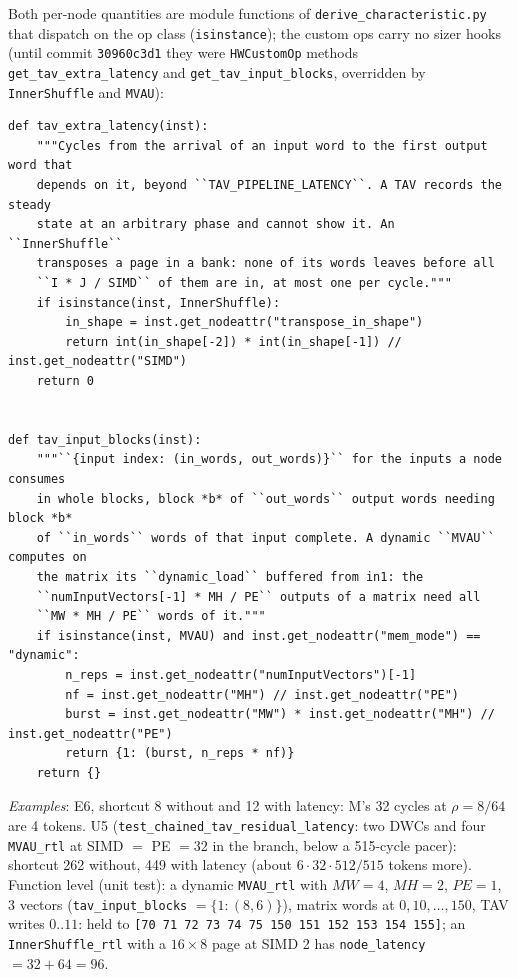 \documentclass[10pt,a4paper]{article}
\newcommand{\code}[1]{\texttt{#1}}
\newcommand{\file}{\code{derive\_characteristic.py}}
\begin{document}
Both per-node quantities are module functions of \file{} that dispatch on the op
class (\code{isinstance}); the custom ops carry no sizer hooks (until commit
\code{30960c3d1} they were \code{HWCustomOp} methods \code{get\_tav\_extra\_latency} and
\code{get\_tav\_input\_blocks}, overridden by \code{InnerShuffle} and \code{MVAU}):

\begin{lstlisting}[firstnumber=405,title={\texttt{src/finn/transformation/fpgadataflow/derive\_characteristic.py}, lines 405--429}]
def tav_extra_latency(inst):
    """Cycles from the arrival of an input word to the first output word that
    depends on it, beyond ``TAV_PIPELINE_LATENCY``. A TAV records the steady
    state at an arbitrary phase and cannot show it. An ``InnerShuffle``
    transposes a page in a bank: none of its words leaves before all
    ``I * J / SIMD`` of them are in, at most one per cycle."""
    if isinstance(inst, InnerShuffle):
        in_shape = inst.get_nodeattr("transpose_in_shape")
        return int(in_shape[-2]) * int(in_shape[-1]) // inst.get_nodeattr("SIMD")
    return 0


def tav_input_blocks(inst):
    """``{input index: (in_words, out_words)}`` for the inputs a node consumes
    in whole blocks, block *b* of ``out_words`` output words needing block *b*
    of ``in_words`` words of that input complete. A dynamic ``MVAU`` computes on
    the matrix its ``dynamic_load`` buffered from in1: the
    ``numInputVectors[-1] * MH / PE`` outputs of a matrix need all
    ``MW * MH / PE`` words of it."""
    if isinstance(inst, MVAU) and inst.get_nodeattr("mem_mode") == "dynamic":
        n_reps = inst.get_nodeattr("numInputVectors")[-1]
        nf = inst.get_nodeattr("MH") // inst.get_nodeattr("PE")
        burst = inst.get_nodeattr("MW") * inst.get_nodeattr("MH") // inst.get_nodeattr("PE")
        return {1: (burst, n_reps * nf)}
    return {}
\end{lstlisting}

\emph{Examples}: E6, shortcut 8 without and 12 with latency: M's 32 cycles at
$\rho=8/64$ are 4 tokens. U5 (\code{test\_chained\_tav\_residual\_latency}: two DWCs and four
\code{MVAU\_rtl} at SIMD $=$ PE $=32$ in the branch, below a 515-cycle pacer): shortcut 262 without, 449 with latency
(about $6\cdot32\cdot512/515$ tokens more). Function level (unit test): a dynamic
\code{MVAU\_rtl} with $MW{=}4$, $MH{=}2$, $PE{=}1$, 3 vectors (\code{tav\_input\_blocks}
$=\{1:(8,6)\}$), matrix words at $0,10,\dots,150$, TAV writes $0..11$: held to
\code{[70 71 72 73 74 75 150 151 152 153 154 155]}; an \code{InnerShuffle\_rtl} with a
$16\times8$ page at SIMD 2 has \code{node\_latency} $=32+64=96$.
\end{document}
